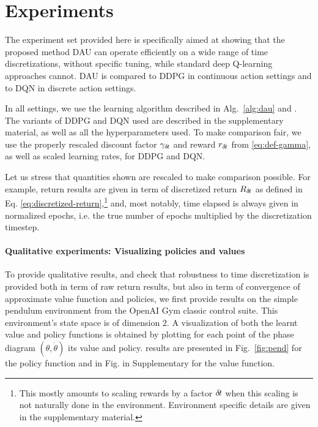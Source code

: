 \section{Experiments}
\label{sec:exp}

The experiment set provided here is specifically aimed at showing that
the proposed method DAU can operate efficiently on a wide range of time
discretizations, without specific tuning, while standard deep Q-learning
approaches cannot. DAU is compared to DDPG in continuous action settings and to DQN in
discrete action settings. 

In all settings, we use the learning algorithm described in
Alg.~\ref{alg:dau} and . The variants of DDPG and DQN
used are described in the supplementary material, as well as all the hyperparameters
used. To make comparison fair, we use the properly rescaled discount
factor $\gamma_{\delta\hspace{-.1em}t}$ and reward $r_{\delta\hspace{-.1em}t}$ from \eqref{eq:def-gamma},
as well as scaled learning rates, for DDPG and DQN. 

Let us stress that quantities shown are rescaled to make comparison possible. For example,
return results are given in term of discretized return $R_{\delta\hspace{-.1em}t}$ as defined in Eq. \eqref{eq:discretized-return},\footnote{This mostly amounts to scaling rewards
by a factor ${\delta\hspace{-.1em}t}$ when this scaling is not naturally done in the environment. Environment specific
details are given in the supplementary material.} and, most notably, time elapsed is always given in
normalized epochs, i.e. the true number of epochs multiplied by the discretization timestep.


\paragraph{Qualitative experiments: Visualizing policies and values}
To provide qualitative results, and check that robustness to time
discretization is provided both in term of raw return results, but also in term
of convergence of approximate value function and policies, we first provide results on the simple pendulum environment
from the OpenAI Gym classic control suite.  This environment's state space is of dimension $2$. A visualization of both the learnt value and policy functions is obtained by plotting for each point of the phase diagram $(\theta, \dot{\theta})$ its value and policy. results are presented in
Fig.~\ref{fig:pend} for the policy function and in Fig. in Supplementary  for the value function.

